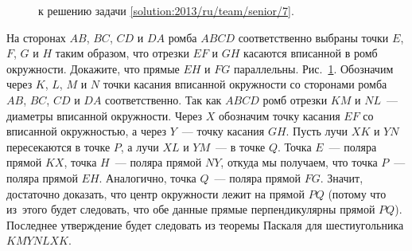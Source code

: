 \ifsolution
\begin{figure}\centering
    \caption{к решению задачи \ref{solution:2013/ru/team/senior/7}.}
    \label{fig:solution:2013/ru/team/senior/7}
\end{figure}%
\fi %

\problem{}
На сторонах $AB$, $BC$, $CD$ и $DA$ ромба $ABCD$ соответственно выбраны точки
$E$, $F$, $G$ и $H$ таким образом, что отрезки $EF$ и $GH$ касаются вписанной в
ромб окружности.
Докажите, что прямые $EH$ и $FG$ параллельны.
\solution
\label{solution:2013/ru/team/senior/7}
Рис.~\ref{fig:solution:2013/ru/team/senior/7}.
Обозначим через $K$, $L$, $M$ и $N$ точки касания вписанной окружности со
сторонами ромба $AB$, $BC$, $CD$ и $DA$ соответственно.
Так как $ABCD$ ромб отрезки $KM$ и $NL$~--- диаметры вписанной окружности.
Через $X$ обозначим точку касания $EF$ со вписанной окружностью, а через
$Y$~--- точку касания $GH$.
Пусть лучи $XK$ и $YN$ пересекаются в точке $P$, а лучи $XL$ и $YM$~--- в точке
$Q$.
Точка $E$~--- поляра прямой $KX$, точка $H$~--- поляра прямой $NY$, откуда мы
получаем, что точка $P$~--- поляра прямой $EH$.
Аналогично, точка $Q$~--- поляра прямой $FG$.
Значит, достаточно доказать, что центр окружности лежит на прямой $PQ$
(потому что из~этого будет следовать, что обе данные прямые перпендикулярны
прямой $PQ$).
Последнее утверждение будет следовать из теоремы Паскаля для шестиугольника
$KMYNLXK$.
\endproblem
